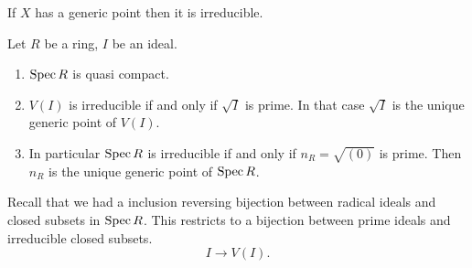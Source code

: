 \begin{note}
	If $X$ has a generic point then it is irreducible.
\end{note}

\begin{proposition}
	Let $R$ be a ring, $I $ be an ideal. 
	\begin{enumerate}
		\item $\operatorname{Spec} R$ is quasi compact. 
		\item $V(I)$ is irreducible if and only if $\sqrt{I} $ is prime. 
			In that case $\sqrt{I} $ is the unique generic point of $V(I)$. 
		\item In particular $\operatorname{Spec} R$ is irreducible if and only if $n_R = \sqrt{(0)} $ is prime. 
			Then $n_R$ is the unique generic point of $\operatorname{Spec} R$. 
	\end{enumerate}
\end{proposition}
\begin{corollary}
Recall that we had a inclusion reversing bijection between radical ideals and closed subsets in  $\operatorname{Spec} R$.
This restricts to a bijection between prime ideals and irreducible closed subsets. \[
	I \to V(I)
.\] 	
\end{corollary}

